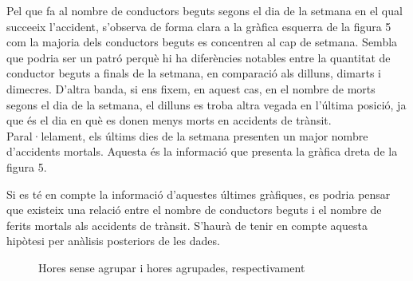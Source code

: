 \documentclass[11pt,longbibliography]{article}
\theoremstyle{definition}
\theoremstyle{remark}
\begin{document}
Pel que fa al nombre de conductors beguts segons el dia de la setmana en el qual succeeix l'accident, s'observa de forma clara a la gràfica esquerra de la figura 5 com la majoria dels conductors beguts es concentren al cap de setmana. Sembla que podria ser un patró perquè hi ha diferències notables entre la quantitat de conductor beguts a finals de la setmana, en comparació als dilluns, dimarts i dimecres. D'altra banda, si ens fixem, en aquest cas, en el nombre de morts segons el dia de la setmana, el dilluns es troba altra vegada en l'última posició, ja que és el dia en què es donen menys morts en accidents de trànsit. Paral·lelament, els últims dies de la setmana presenten un major nombre d'accidents mortals. Aquesta és la informació que presenta la gràfica dreta de la figura 5.


Si es té en compte la informació d'aquestes últimes gràfiques, es podria pensar que existeix una relació entre el nombre de conductors beguts i el nombre de ferits mortals als accidents de trànsit. S'haurà de tenir en compte aquesta hipòtesi per anàlisis posteriors de les dades.

\begin{figure}[h!]
\par
{}%
\hfill
{}%
\par

\caption{Hores sense agrupar i hores agrupades, respectivament}
\label{fig:G2}
\end{figure}
\end{document}
